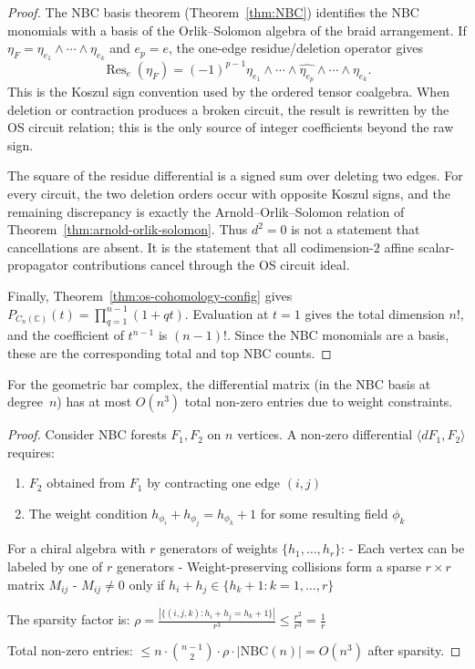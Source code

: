 \begin{proof}
The NBC basis theorem (Theorem~\ref{thm:NBC}) identifies the NBC
monomials with a basis of the Orlik--Solomon algebra of the braid
arrangement. If
$\eta_F=\eta_{e_1}\wedge\cdots\wedge\eta_{e_k}$ and $e_p=e$, the
one-edge residue/deletion operator gives
\[
\operatorname{Res}_{e}(\eta_F)
=
(-1)^{p-1}
\eta_{e_1}\wedge\cdots\wedge\widehat{\eta_{e_p}}\wedge\cdots
\wedge\eta_{e_k}.
\]
This is the Koszul sign convention used by the ordered tensor coalgebra.
When deletion or contraction produces a broken circuit, the result is
rewritten by the OS circuit relation; this is the only source of
integer coefficients beyond the raw sign.

The square of the residue differential is a signed sum over deleting two
edges. For every circuit, the two deletion orders occur with opposite
Koszul signs, and the remaining discrepancy is exactly the
Arnold--Orlik--Solomon relation of
Theorem~\ref{thm:arnold-orlik-solomon}. Thus $d^2=0$ is not a statement
that cancellations are absent. It is the statement that all
codimension-$2$ affine scalar-propagator contributions cancel through
the OS circuit ideal.

Finally,
Theorem~\ref{thm:os-cohomology-config} gives
$P_{C_n(\mathbb C)}(t)=\prod_{q=1}^{n-1}(1+qt)$. Evaluation at $t=1$
gives the total dimension $n!$, and the coefficient of $t^{n-1}$ is
$(n-1)!$. Since the NBC monomials are a basis, these are the
corresponding total and top NBC counts.
\end{proof}

\begin{proposition}\label{prop:nbc-sparsity}
For the geometric bar complex, the differential matrix (in the NBC basis at degree~$n$) has at most $O(n^3)$ total non-zero entries due to weight constraints.
\end{proposition}

\begin{proof}
Consider NBC forests $F_1, F_2$ on $n$ vertices. A non-zero differential $\langle dF_1, F_2 \rangle$ requires:
\begin{enumerate}
\item $F_2$ obtained from $F_1$ by contracting one edge $(i,j)$
\item The weight condition $h_{\phi_i} + h_{\phi_j} = h_{\phi_k} + 1$ for some resulting field $\phi_k$
\end{enumerate}

For a chiral algebra with $r$ generators of weights $\{h_1, \ldots, h_r\}$:
- Each vertex can be labeled by one of $r$ generators
- Weight-preserving collisions form a sparse $r \times r$ matrix $M_{ij}$
- $M_{ij} \neq 0$ only if $h_i + h_j \in \{h_k + 1 : k = 1, \ldots, r\}$

The sparsity factor is:
$\rho = \frac{|\{(i,j,k) : h_i + h_j = h_k + 1\}|}{r^3} \leq \frac{r^2}{r^3} = \frac{1}{r}$

Total non-zero entries: $\leq n \cdot \binom{n-1}{2} \cdot \rho \cdot |\text{NBC}(n)| = O(n^3)$ after sparsity.
\end{proof}

